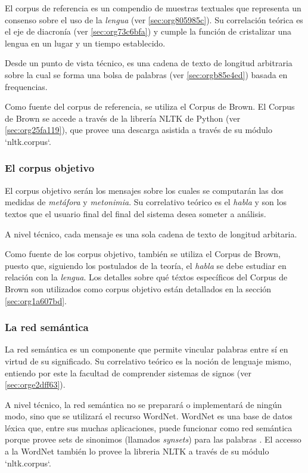 \documentclass[12pt,letterpaper,twoside]{article}
\begin{document}
El corpus de referencia es un compendio de muestras textuales que
representa un consenso sobre el uso de la \emph{lengua}
(ver \ref{sec:org805985c}). Su correlación teórica es el eje de diacronía (ver
\ref{sec:org73c6bfa}) y cumple la función de cristalizar una
lengua en un lugar y un tiempo establecido.

Desde un punto de vista técnico, es una cadena de texto de
longitud arbitraria sobre la cual se forma una bolsa de palabras
(ver \ref{sec:orgb85e4ed}) basada en frequencias.

Como fuente del corpus de referencia, se utiliza el Corpus de
Brown. El Corpus de Brown se accede a través de la librería NLTK
de Python (ver \ref{sec:org25fa119}), que provee una descarga asistida a través
de su módulo `nltk.corpus`.


\subsubsection{El corpus objetivo}
\label{sec:org5ecb4d3}

El corpus objetivo serán los mensajes sobre los cuales se
computarán las dos medidas de \emph{metáfora} y \emph{metonimia}.  Su
correlativo teórico es el \emph{habla} y son los textos que el usuario
final del final del sistema desea someter a análisis.

A nivel técnico, cada mensaje es una sola cadena de texto de
longitud arbitaria.

Como fuente de los corpus objetivo, también se utiliza el Corpus
de Brown, puesto que, siguiendo los postulados de la teoría, el
\emph{habla} se debe estudiar en relación con la \emph{lengua}. Los
detalles sobre qué téxtos específicos del Corpus de Brown son
utilizados como corpus objetivo están detallados en la sección
\ref{sec:org1a607bd}.



\subsubsection{La red semántica}
\label{sec:orgbf41d5c}

La red semántica es un componente que permite vincular palabras
entre sí en virtud de su significado. Su correlativo teórico
es la noción de lenguaje mismo, entiendo por este la facultad
de comprender sistemas de signos (ver \ref{sec:orge2dff63}).

A nivel técnico, la red semántica no se preparará o implementará
de ningún modo, sino que se utilizará el recurso WordNet. WordNet
es una base de datos léxica que, entre sus muchas aplicaciones,
puede funcionar como red semántica porque provee sets de
sinonimos (llamados \emph{synsets}) para las palabras
\cite{fellbaum_1998}. El accesso a la WordNet también lo provee la
libreria NLTK a través de su módulo `nltk.corpus`.
\end{document}
